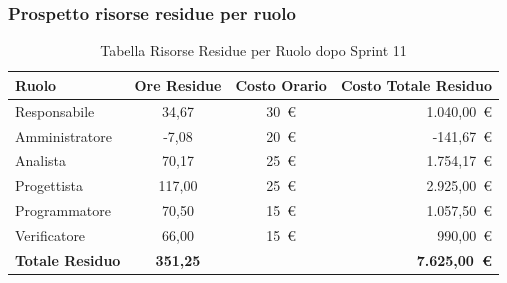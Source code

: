 \subsubsection{Prospetto risorse residue per ruolo}
\begin{table}[H]
    \centering
    \renewcommand{\arraystretch}{1.3}
    \begin{tabularx}{\textwidth}{|X|c|c|r|}
        \hline
        \textbf{Ruolo} & \textbf{Ore Residue} & \textbf{Costo Orario} &
        \textbf{Costo Totale Residuo} \\
        \hline
        Responsabile   & 34,67 & 30~\euro & 1.040{,}00~\euro \\
        Amministratore & -7,08 & 20~\euro &   -141{,}67~\euro \\
        Analista       & 70,17 & 25~\euro & 1.754{,}17~\euro \\
        Progettista    & 117,00 & 25~\euro & 2.925{,}00~\euro \\
        Programmatore  & 70,50 & 15~\euro & 1.057{,}50~\euro \\
        Verificatore   & 66,00 & 15~\euro & 990{,}00~\euro \\
        \hline
        \textbf{Totale Residuo} & \textbf{351,25} & &
        \textbf{7.625{,}00~\euro} \\
        \hline
    \end{tabularx}
    \caption{Tabella Risorse Residue per Ruolo dopo Sprint 11}
\end{table}


